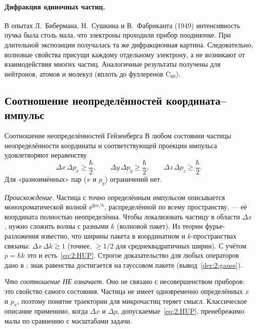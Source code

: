 \paragraph{Дифракция одиночных частиц.} В опытах Л.~Бибермана, Н.~Сушкина и В.~Фабриканта (1949)
интенсивность пучка была столь мала, что электроны проходили прибор поодиночке. При длительной
экспозиции получалась та же дифракционная картина. Следовательно, волновые свойства присущи
каждому отдельному электрону, а не возникают от взаимодействия многих частиц. Аналогичные
результаты получены для нейтронов, атомов и молекул (вплоть до фуллеренов C$_{60}$).

\subsection{Соотношение неопределённостей координата--импульс}

\begin{principle}{Соотношение неопределённостей Гейзенберга}
В любом состоянии частицы неопределённости координаты и соответствующей проекции импульса
удовлетворяют неравенству
\begin{equation}\label{eq:2:HUP}
  \Delta x\,\Delta p_x\ge\frac{\hbar}{2},\qquad
  \Delta y\,\Delta p_y\ge\frac{\hbar}{2},\qquad
  \Delta z\,\Delta p_z\ge\frac{\hbar}{2}.
\end{equation}
Для «разноимённых» пар ($x$ и $p_y$) ограничений нет.
\end{principle}

\emph{Происхождение.} Частица с точно определённым импульсом описывается монохроматической
волной $\ee^{\ii p x/\hbar}$, распределённой по всему пространству, — её координата полностью
неопределённа. Чтобы локализовать частицу в области $\Delta x$, нужно сложить волны с разными
$k$ (волновой пакет). Из теории фурье-разложения известно, что ширины пакета в координатном и
$k$-пространствах связаны: $\Delta x\,\Delta k\gtrsim1$ (точнее, $\ge1/2$ для среднеквадратичных
ширин). С учётом $p=\hbar k$ это и есть~\eqref{eq:2:HUP}. Строгое доказательство для любых
операторов дано в ; знак равенства достигается на гауссовом пакете
(вывод~\ref{der:2:gauss}).

\emph{Что соотношение НЕ означает.} Оно не связано с несовершенством приборов: это свойство
самого состояния. Частица не имеет одновременно определённых $x$ и $p_x$, поэтому понятие
траектории для микрочастиц теряет смысл. Классическое описание применимо, когда $\Delta x$ и
$\Delta p$, допускаемые~\eqref{eq:2:HUP}, пренебрежимо малы по сравнению с масштабами задачи.

